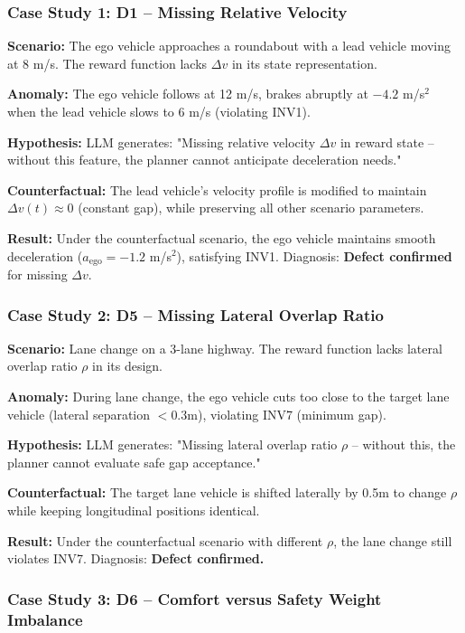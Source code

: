 \documentclass[conference]{IEEEtran}
\theoremstyle{plain}
\begin{document}
\subsubsection{Case Study 1: D1 -- Missing Relative Velocity}

\textbf{Scenario:} The ego vehicle approaches a roundabout with a lead vehicle moving at 8 m/s. The reward function lacks $\Delta v$ in its state representation.

\textbf{Anomaly:} The ego vehicle follows at 12 m/s, brakes abruptly at $-4.2$ m/s$^2$ when the lead vehicle slows to 6 m/s (violating INV1).

\textbf{Hypothesis:} LLM generates: "Missing relative velocity $\Delta v$ in reward state -- without this feature, the planner cannot anticipate deceleration needs."

\textbf{Counterfactual:} The lead vehicle's velocity profile is modified to maintain $\Delta v(t) \approx 0$ (constant gap), while preserving all other scenario parameters.

\textbf{Result:} Under the counterfactual scenario, the ego vehicle maintains smooth deceleration ($a_{\text{ego}} = -1.2$ m/s$^2$), satisfying INV1. Diagnosis: \textbf{Defect confirmed} for missing $\Delta v$.

\subsubsection{Case Study 2: D5 -- Missing Lateral Overlap Ratio}

\textbf{Scenario:} Lane change on a 3-lane highway. The reward function lacks lateral overlap ratio $\rho$ in its design.

\textbf{Anomaly:} During lane change, the ego vehicle cuts too close to the target lane vehicle (lateral separation $< 0.3$m), violating INV7 (minimum gap).

\textbf{Hypothesis:} LLM generates: "Missing lateral overlap ratio $\rho$ -- without this, the planner cannot evaluate safe gap acceptance."

\textbf{Counterfactual:} The target lane vehicle is shifted laterally by 0.5m to change $\rho$ while keeping longitudinal positions identical.

\textbf{Result:} Under the counterfactual scenario with different $\rho$, the lane change still violates INV7. Diagnosis: \textbf{Defect confirmed.}

\subsubsection{Case Study 3: D6 -- Comfort versus Safety Weight Imbalance}
\end{document}
